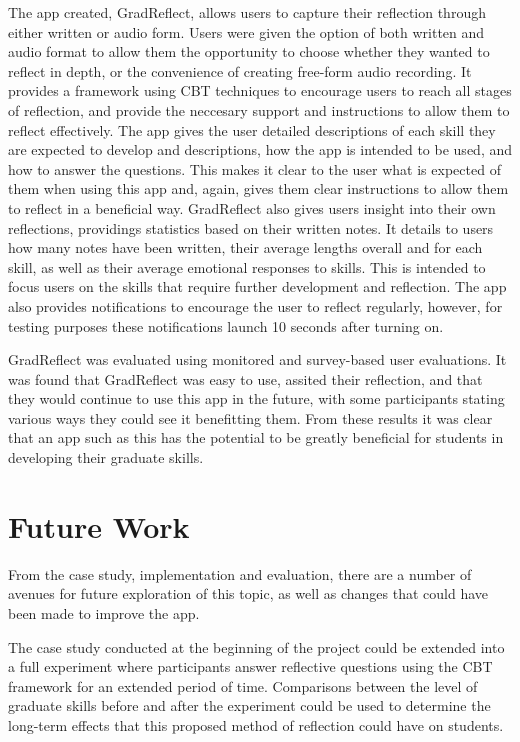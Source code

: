 \documentclass{l4proj}
\begin{document}
The app created, GradReflect, allows users to capture their reflection through either written or audio form. Users were given the option of both written and audio format to allow them the opportunity to choose whether they wanted to reflect in depth, or the convenience of creating free-form audio recording. It provides a framework using CBT techniques to encourage users to reach all stages of reflection, and provide the neccesary support and instructions to allow them to reflect effectively. The app gives the user detailed descriptions of each skill they are expected to develop and descriptions, how the app is intended to be used, and how to answer the questions. This makes it clear to the user what is expected of them when using this app and, again, gives them clear instructions to allow them to reflect in a beneficial way. GradReflect also gives users insight into their own reflections, providings statistics based on their written notes. It details to users how many notes have been written, their average lengths overall and for each skill, as well as their average emotional responses to skills. This is intended to focus users on the skills that require further development and reflection. The app also provides notifications to encourage the user to reflect regularly, however, for testing purposes these notifications launch 10 seconds after turning on.

GradReflect was evaluated using monitored and survey-based user evaluations. It was found that GradReflect was easy to use, assited their reflection, and that they would continue to use this app in the future, with some participants stating various ways they could see it benefitting them. From these results it was clear that an app such as this has the potential to be greatly beneficial for students in developing their graduate skills.


\section{Future Work} \label{Concl_futureWork}

From the case study, implementation and evaluation, there are a number of avenues for future exploration of this topic, as well as changes that could have been made to improve the app. 

The case study conducted at the beginning of the project could be extended into a full experiment where participants answer reflective questions using the CBT framework for an extended period of time. Comparisons between the level of graduate skills before and after the experiment could be used to determine the long-term effects that this proposed method of reflection could have on students. 
\end{document}
